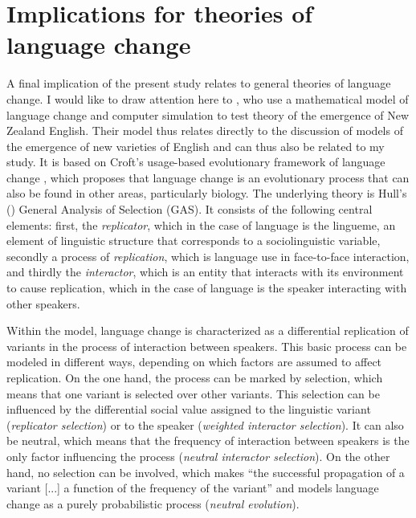 \section{Implications for theories of language change}
\hypertarget{Toc63021255}{}
A final implication of the present study relates to general theories of language change. I would like to draw attention here to \citet{Baxter2009}, who use a mathematical model of language change and computer simulation to test  theory of the emergence of New Zealand English. Their model thus relates directly to the discussion of models of the emergence of new varieties of English and can thus also be related to my study. It is based on Croft’s usage-based evolutionary framework of language change \citep{Croft2000, Croft2006}, which proposes that language change is an evolutionary process that can also be found in other areas, particularly biology. The underlying theory is Hull’s (\citeyear{Hull2001, Hull1988}) General Analysis of Selection (GAS). It consists of the following central elements: first, the \textit{replicator}, which in the case of language is the lingueme, an element of linguistic structure that corresponds to a sociolinguistic variable, secondly a process of \textit{replication}, which is language use in face-to-face interaction, and thirdly the \textit{interactor}, which is an entity that interacts with its environment to cause replication, which in the case of language is the speaker interacting with other speakers.

Within the model, language change is characterized as a differential replication of variants in the process of interaction between speakers. This basic process can be modeled in different ways, depending on which factors are assumed to affect replication. On the one hand, the process can be marked by selection, which means that one variant is selected over other variants. This selection can be influenced by the differential social value assigned to the linguistic variant (\textit{replicator selection}) or to the speaker (\textit{weighted interactor selection}). It can also be neutral, which means that the frequency of interaction between speakers is the only factor influencing the process (\textit{neutral interactor selection}). On the other hand, no selection can be involved, which makes “the successful propagation of a variant [...] a function of the frequency of the variant” and models language change as a purely probabilistic process (\textit{neutral evolution}).

